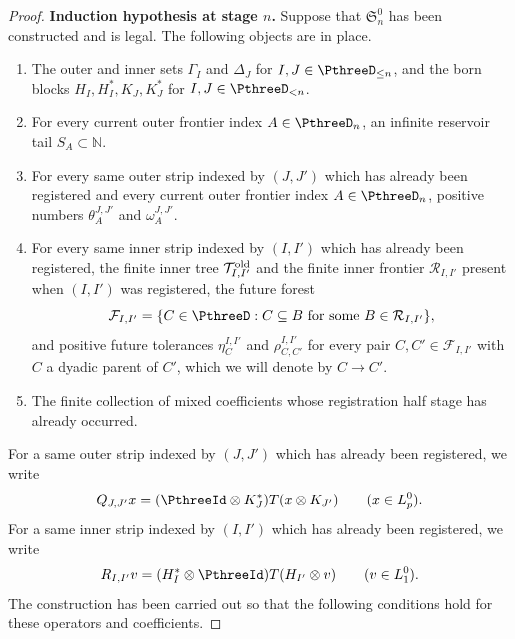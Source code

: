 \documentclass[11pt,reqno]{amsart}
\makeatletter
\theoremstyle{plain}
\theoremstyle{definition}
\newcounter{problempaper}
\newenvironment{problempaperbody}{%
  \setcounter{subsection}{0}%
  \setcounter{subsubsection}{0}%
  \setcounter{paragraph}{0}%
  \renewcommand{\thesubsection}{\arabic{subsection}}%
  \renewcommand{\thesubsubsection}{\thesubsection.\arabic{subsubsection}}%
  \renewcommand{\theparagraph}{\thesubsubsection.\arabic{paragraph}}%
  \let\problem@outersection\section
  \let\problem@outersubsection\subsection
  \let\problem@outersubsubsection\subsubsection
  \let\problem@outerparagraph\paragraph
  \let\section\problem@papersection
  \let\subsection\problem@papersubsection
  \let\subsubsection\problem@papersubsubsection
}{%
  \let\section\problem@outersection
  \let\subsection\problem@outersubsection
  \let\subsubsection\problem@outersubsubsection
  \let\paragraph\problem@outerparagraph
}
\newcommand{\problem@target}[2]{%
  \hypertarget{problem-\theproblempaper-#1-#2}{}%
}
\newcommand{\problem@paperheading}[3]{%
  \par\bigskip
  \problem@target{#1}{#2}%
  \noindent{\large\bfseries #2.\quad #3\par}%
  \nobreak\smallskip
}
\newcommand{\problem@papersubheading}[3]{%
  \par\medskip
  \problem@target{#1}{#2}%
  \noindent{\normalsize\bfseries #2.\quad #3\par}%
  \nobreak\smallskip
}
\newcommand{\problem@papersubsubheading}[3]{%
  \par\smallskip
  \problem@target{#1}{#2}%
  \noindent{\normalsize\itshape #2.\quad #3.\ }%
}
\def\problem@papersection{%
  \@ifstar{\problem@papersectionstar}{\problem@papersectionnostar}%
}
\def\problem@papersectionstar#1{%
  \par\bigskip\noindent{\large\bfseries #1\par}\nobreak\smallskip
}
\def\problem@papersectionnostar#1{%
  \refstepcounter{subsection}%
  \setcounter{subsubsection}{0}%
  \setcounter{paragraph}{0}%
  \problem@paperheading{section}{\thesubsection}{#1}%
  \problem@writecontentsline{section}{\thesubsection}{#1}%
}
\def\problem@papersubsection{%
  \@ifstar{\problem@papersubsectionstar}{\problem@papersubsectionnostar}%
}
\def\problem@papersubsectionstar#1{%
  \par\medskip\noindent{\normalsize\bfseries #1\par}\nobreak\smallskip
}
\def\problem@papersubsectionnostar#1{%
  \refstepcounter{subsubsection}%
  \setcounter{paragraph}{0}%
  \problem@papersubheading{subsection}{\thesubsubsection}{#1}%
  \problem@writecontentsline{subsection}{\thesubsubsection}{#1}%
}
\def\problem@papersubsubsection{%
  \@ifstar{\problem@papersubsubsectionstar}{\problem@papersubsubsectionnostar}%
}
\def\problem@papersubsubsectionstar#1{%
  \par\smallskip\noindent{\normalsize\itshape #1.\ }%
}
\def\problem@papersubsubsectionnostar#1{%
  \refstepcounter{paragraph}%
  \problem@papersubsubheading{subsubsection}{\theparagraph}{#1}%
  \problem@writecontentsline{subsubsection}{\theparagraph}{#1}%
}
\newcommand{\problem@writecontentsline}[3]{%
  \begingroup
  \protected@write\@auxout{}{%
    \string\problemcontentsentry{\theproblempaper}{#1}{#2}{#3}{\thepage}%
  }%
  \endgroup
}
\newcommand{\problemcontentsentry}[5]{%
  \@ifundefined{problemcontents@#1}{%
    \expandafter\gdef\csname problemcontents@#1\endcsname{}%
  }{}%
  \expandafter\g@addto@macro\csname problemcontents@#1\endcsname{%
    \problemcontentsline{#1}{#2}{#3}{#4}{#5}%
  }%
}
\newcommand{\problemcontentslink}[4]{%
  \hyperlink{problem-#1-#2-#3}{#4}%
}
\newcommand{\problemcontentsline}[5]{%
  \ifstrequal{#2}{section}{%
    \par\noindent
    \problemcontentslink{#1}{#2}{#3}{\makebox[2.5em][l]{#3}#4}%
    \nobreak\dotfill
    \problemcontentslink{#1}{#2}{#3}{#5}\par
  }{%
    \ifstrequal{#2}{subsection}{%
      \par\noindent\hspace*{1.5em}%
      \problemcontentslink{#1}{#2}{#3}{\makebox[3.5em][l]{#3}#4}%
      \nobreak\dotfill
      \problemcontentslink{#1}{#2}{#3}{#5}\par
    }{%
      \par\noindent\hspace*{3em}%
      \problemcontentslink{#1}{#2}{#3}{\makebox[4.5em][l]{#3}#4}%
      \nobreak\dotfill
      \problemcontentslink{#1}{#2}{#3}{#5}\par
    }%
  }%
}
\makeatother
\begin{document}
\begin{problempaperbody}
\begin{proof}
\medskip
\noindent\textbf{Induction hypothesis at stage $n$.} Suppose that $\mathfrak S_n^0$ has been constructed and is legal. The following objects are in place.
\begin{enumerate}[label=\textup{(Q\arabic*)},ref=Q\arabic*]
\item\label{p3:item:quantity-sets} The outer and inner sets $\Gamma_I$ and $\Delta_J$ for $I,J\in\PthreeD_{\leq n}$, and the born blocks $H_I,H_I^*,K_J,K_J^*$ for $I,J\in\PthreeD_{<n}$.
\item\label{p3:item:quantity-reservoirs} For every current outer frontier index $A\in\PthreeD_n$, an infinite reservoir tail $S_A\subset\mathbb N$.
\item\label{p3:item:quantity-same-outer} For every same outer strip indexed by $(J,J')$ which has already been registered and every current outer frontier index $A\in\PthreeD_n$, positive numbers $\theta_A^{J,J'}$ and $\omega_A^{J,J'}$.
\item\label{p3:item:quantity-same-inner} For every same inner strip indexed by $(I,I')$ which has already been registered, the finite inner tree $\mathcal T_{I,I'}^{\rm old}$ and the finite inner frontier $\mathcal R_{I,I'}$ present when $(I,I')$ was registered, the future forest
\begin{equation*}
        \mathcal F_{I,I'}=\{C\in\PthreeD:C\subseteq B\text{ for some }B\in\mathcal R_{I,I'}\},
\end{equation*}
and positive future tolerances $\eta_C^{I,I'}$ and $\rho_{C,C'}^{I,I'}$ for every pair $C,C'\in\mathcal F_{I,I'}$ with $C$ a dyadic parent of $C'$, which we will denote by $C\to C'$.
\item\label{p3:item:quantity-mixed} The finite collection of mixed coefficients whose registration half stage has already occurred.
\end{enumerate}
For a same outer strip indexed by $(J,J')$ which has already been registered, we write
\begin{equation}
\label{p3:eq:same-outer-operator}
        Q_{J,J'}x=(\PthreeId\otimes K_J^*)T(x\otimes K_{J'})\qquad(x\in L_p^0).
\end{equation}
For a same inner strip indexed by $(I,I')$ which has already been registered, we write
\begin{equation}
\label{p3:eq:same-inner-operator}
        R_{I,I'}v=(H_I^*\otimes\PthreeId)T(H_{I'}\otimes v)\qquad(v\in L_1^0).
\end{equation}
The construction has been carried out so that the following conditions hold for these operators and coefficients.

\end{proof}
\end{problempaperbody}
\end{document}
